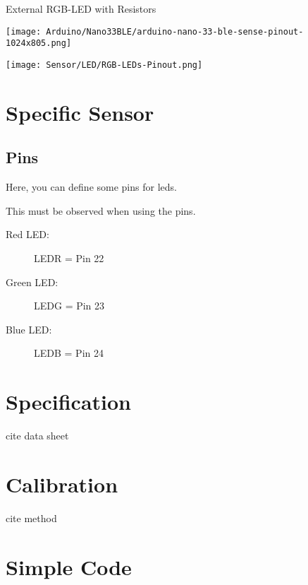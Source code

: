 External RGB-LED with Resistors \cite{Simac:2020,Kingbright:2010}



\texttt{[image: Arduino/Nano33BLE/arduino-nano-33-ble-sense-pinout-1024x805.png]}


\begin{center}
  \texttt{[image: Sensor/LED/RGB-LEDs-Pinout.png]}
\end{center}


\section{Specific Sensor}






\subsection{Pins}

Here, you can define some pins for \ac{led}s. 


This must be observed when using the pins.



\begin{description}
    \item [Red LED:] LEDR = Pin 22
    \item [Green LED:] LEDG = Pin 23
    \item [Blue LED:] LEDB = Pin 24
\end{description}



\section{Specification}

cite data sheet


\section{Calibration}

cite method

\section{Simple Code}


